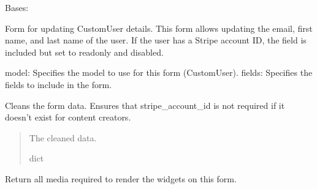 \documentclass[letterpaper,10pt,english]{sphinxmanual}
\begin{document}

\begin{fulllineitems}
\label{\detokenize{modules/forms:account.forms.CustomUserUpdateForm}}
\pysigstartsignatures
{}
\pysigstopsignatures
\sphinxAtStartPar
Bases: 

\sphinxAtStartPar
Form for updating CustomUser details. This form allows updating the email,
first name, and last name of the user. If the user has a Stripe account ID,
the field is included but set to read\sphinxhyphen{}only and disabled.
\begin{description}
\sphinxAtStartPar
model: Specifies the model to use for this form (CustomUser).
fields: Specifies the fields to include in the form.

\end{description}

\begin{fulllineitems}
\label{\detokenize{modules/forms:account.forms.CustomUserUpdateForm.clean}}
\pysigstartsignatures
{}
\pysigstopsignatures
\sphinxAtStartPar
Cleans the form data. Ensures that stripe\_account\_id is not required if it doesn’t exist
for content creators.
\begin{quote}\begin{description}
\sphinxAtStartPar
The cleaned data.

\sphinxAtStartPar
dict

\end{description}\end{quote}

\end{fulllineitems}


\begin{fulllineitems}
\label{\detokenize{modules/forms:account.forms.CustomUserUpdateForm.media}}
\pysigstartsignatures
{}
\pysigstopsignatures
\sphinxAtStartPar
Return all media required to render the widgets on this form.

\end{fulllineitems}


\end{fulllineitems}
\end{document}
